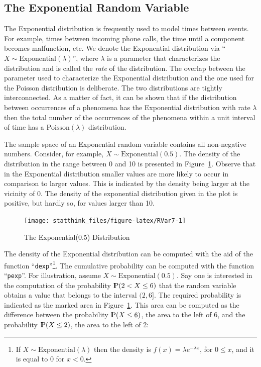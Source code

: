 \documentclass[]{krantz}
\newcommand{\Prob}{{\rm I\kern-.3em P}}
\theoremstyle{definition}
\theoremstyle{definition}
\theoremstyle{definition}
\theoremstyle{remark}
\begin{document}
\subsection{The Exponential Random
Variable}\label{the-exponential-random-variable}

The Exponential distribution is frequently used to model times between
events. For example, times between incoming phone calls, the time until
a component becomes malfunction, etc. We denote the Exponential
distribution via ``\(X \sim \mathrm{Exponential}(\lambda)\)'', where
\(\lambda\) is a parameter that characterizes the distribution and is
called the \emph{rate} of the distribution. The overlap between the
parameter used to characterize the Exponential distribution and the one
used for the Poisson distribution is deliberate. The two distributions
are tightly interconnected. As a matter of fact, it can be shown that if
the distribution between occurrences of a phenomena has the Exponential
distribution with rate \(\lambda\) then the total number of the
occurrences of the phenomena within a unit interval of time has a
\(\mathrm{Poisson}(\lambda)\) distribution.

The sample space of an Exponential random variable contains all
non-negative numbers. Consider, for example,
\(X \sim \mathrm{Exponential}(0.5)\). The density of the distribution in
the range between 0 and 10 is presented in Figure~\ref{fig:RVar7}.
Observe that in the Exponential distribution smaller values are more
likely to occur in comparison to larger values. This is indicated by the
density being larger at the vicinity of 0. The density of the
exponential distribution given in the plot is positive, but hardly so,
for values larger than 10.

\begin{figure}

{\centering \texttt{[image: statthink\_files/figure-latex/RVar7-1]} 

}

\caption{The Exponential(0.5) Distribution}\label{fig:RVar7}
\end{figure}

The density of the Exponential distribution can be computed with the aid
of the function ``\texttt{dexp}''\footnote{If
  \(X \sim \mathrm{Exponential}(\lambda)\) then the density is
  \(f(x) =\lambda e^{-\lambda x}\), for \(0 \leq x\), and it is equal to
  0 for \(x < 0\).}. The cumulative probability can be computed with the
function ``\texttt{pexp}''. For illustration, assume
\(X \sim \mathrm{Exponential}(0.5)\). Say one is interested in the
computation of the probability \(\Prob(2 < X \leq 6)\) that the random
variable obtains a value that belongs to the interval \((2,6]\). The
required probability is indicated as the marked area in
Figure~\ref{fig:RVar7}. This area can be computed as the difference
between the probability \(\Prob(X \leq 6)\), the area to the left of 6,
and the probability \(\Prob(X \leq 2)\), the area to the left of 2:
\end{document}

